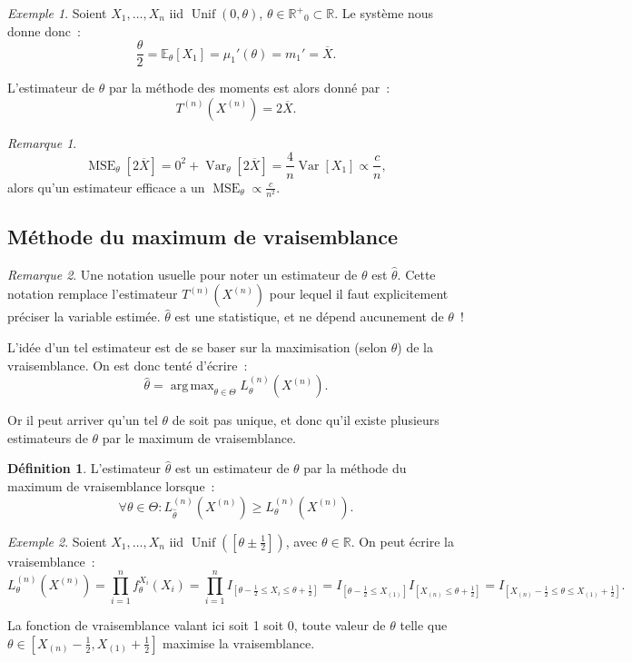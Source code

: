 \documentclass{report}
\DeclareMathOperator{\Unif}{Unif}  %
\DeclareMathOperator{\Var}{Var}
\DeclareMathOperator{\MSE}{MSE}
\DeclareMathOperator*{\argmax}{arg\,max}
\newcommand{\E}{\mathbb E}
\newcommand{\R}{\mathbb R}
\newcommand{\Rp}{{\mathbb R^+}}
\newcommand{\charfun}[1]{I_{\left[#1\right]}}
\newcommand{\n}{{(n)}}
\newcommand{\Xn}{{X^\n}}
\newcommand{\Tn}{{T^\n}}
\newcommand{\TnXn}{{\Tn(\Xn)}}
\theoremstyle{definition}
\newtheorem{déf}[thm]{Définition}
\theoremstyle{remark}
\newtheorem*{rmq}{Remarque}
\newtheorem{ex}{Exemple}[chapter]
\begin{document}
			\begin{ex} Soient $X_1, \ldots, X_n$ iid $\Unif(0, \theta)$, $\theta \in \Rp_0 \subset \R$. Le système nous donne donc~:
			\[\frac \theta2 = \E_\theta[X_1] = \mu_1'(\theta) = m_1' = \overline X.\]

			L'estimateur de $\theta$ par la méthode des moments est alors donné par~:
			\[\TnXn = 2\overline X.\]
			\end{ex}

			\begin{rmq}
			\[\MSE_\theta[2\overline X] = 0^2 + \Var_\theta[2\overline X] = \frac 4n\Var[X_1] \propto \frac cn,\]
			alors qu'un estimateur efficace a un $\MSE_\theta \propto \frac c{n^2}$.
			\end{rmq}


		\subsection{Méthode du maximum de vraisemblance}
			\begin{rmq} Une notation usuelle pour noter un estimateur de $\theta$ est $\widehat \theta$. Cette notation remplace l'estimateur $\TnXn$ pour lequel il faut
			explicitement préciser la variable estimée. $\widehat \theta$ est une statistique, et ne dépend aucunement de $\theta$~!
			\end{rmq}

			L'idée d'un tel estimateur est de se baser sur la maximisation (selon $\theta$) de la vraisemblance. On est donc tenté d'écrire~:
			\[\widehat \theta = \argmax_{\theta \in \Theta}L_\theta^{(n)}(\Xn).\]

			Or il peut arriver qu'un tel $\theta$ de soit pas unique, et donc qu'il existe plusieurs estimateurs de $\theta$ par le maximum de vraisemblance.

			\begin{déf} L'estimateur $\widehat \theta$ est un estimateur de $\theta$ par la méthode du maximum de vraisemblance lorsque~:
			\[\forall \theta \in \Theta : L_{\widehat \theta}^{(n)}(\Xn) \geq L_\theta^{(n)}(\Xn).\]
			\end{déf}

			\begin{ex} Soient $X_1, \ldots, X_n$ iid $\Unif\left(\left[\theta \pm \frac 12\right]\right)$, avec $\theta \in \R$. On peut écrire la vraisemblance~:
			\[L_\theta^\n(\Xn) = \prod_{i=1}^nf^{X_i}_\theta(X_i) = \prod_{i=1}^n\charfun {\theta-\frac 12 \leq X_i \leq \theta+\frac 12}
				= \charfun {\theta-\frac 12 \leq X_{(1)}}\charfun {X_\n \leq \theta+\frac 12} = \charfun {X_\n-\frac 12 \leq \theta \leq X_{(1)}+\frac 12}.\]

			La fonction de vraisemblance valant ici soit 1 soit 0, toute valeur de $\theta$ telle que $\theta \in \left[X_\n-\frac 12, X_{(1)}+\frac 12\right]$ maximise
			la vraisemblance.
			\end{ex}
\end{document}
